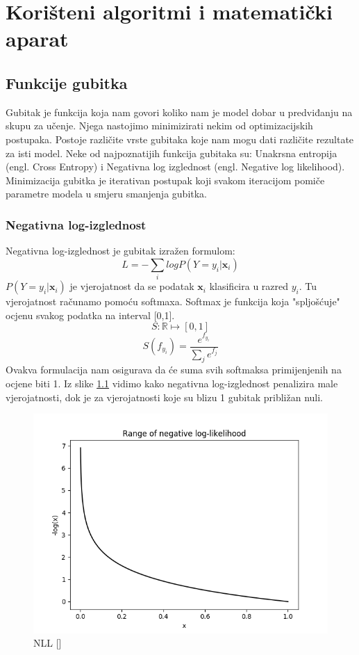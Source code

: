 \chapter{Korišteni algoritmi i matematički aparat}

\section{Funkcije gubitka}

Gubitak je funkcija koja nam govori koliko nam je model dobar u predviđanju na skupu za učenje. Njega nastojimo minimizirati nekim od optimizacijskih postupaka. Postoje različite vrste gubitaka koje nam mogu dati različite rezultate za isti model. Neke od najpoznatijih funkcija gubitaka su: Unakrsna entropija (engl. Cross Entropy) i Negativna log izglednost (engl. Negative log likelihood). Minimizacija gubitka je iterativan postupak koji svakom iteracijom pomiče parametre modela u smjeru smanjenja gubitka.

\subsection{Negativna log-izglednost}
	Negativna log-izglednost je gubitak izražen formulom:
	\[
		L = -\sum_{i}log P(Y = y_i | \textbf{x}_i)
	\]
	$P(Y = y_i | \textbf{x}_i)$ je vjerojatnost da se podatak $\textbf{x}_i$ klasificira u razred $y_i$.
	Tu vjerojatnost računamo pomoću softmaxa. Softmax je funkcija koja "spljošćuje" ocjenu svakog podatka na interval [0,1].
	\[
	S : \mathbb{R} \mapsto [0,1]
	\]
	\[
	S(f_{y_i}) = \frac{e^{f_{y_i}}}{\sum_{j} e^{f_j}}
	\]
	Ovakva formulacija nam osigurava da će suma svih softmaksa primijenjenih na ocjene biti 1. Iz slike \ref{fig:NLL} vidimo kako negativna log-izglednost penalizira male vjerojatnosti, dok je za vjerojatnosti koje su blizu 1 gubitak približan nuli.
	\begin{figure}[H]
		\centering\includegraphics[scale=0.5]{slike/neg_log.png}
		\caption{NLL [\cite{miranda2017softmax}]}
		\label{fig:NLL}
	\end{figure}

